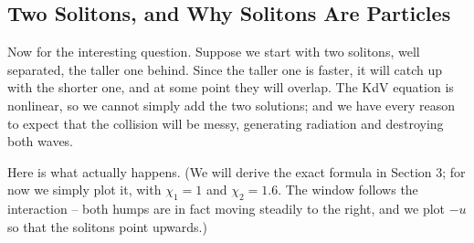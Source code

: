 \subsection{Two Solitons, and Why Solitons Are Particles}

Now for the interesting question. Suppose we start with two solitons, well separated, the taller one behind. Since the taller one is faster, it will catch up with the shorter one, and at some point they will overlap. The KdV equation is nonlinear, so we cannot simply add the two solutions; and we have every reason to expect that the collision will be messy, generating radiation and destroying both waves.

Here is what actually happens. (We will derive the exact formula in Section 3; for now we simply plot it, with $\chi_1 = 1$ and $\chi_2 = 1.6$. The window follows the interaction -- both humps are in fact moving steadily to the right, and we plot $-u$ so that the solitons point upwards.)
